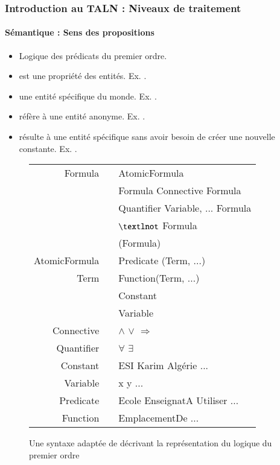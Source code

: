 \documentclass[xcolor=table]{beamer}
\begin{document}
\begin{frame}
\frametitle{Introduction au TALN : Niveaux de traitement}
\framesubtitle{Sémantique : Sens des propositions}

\begin{minipage}{0.5\textwidth}
\begin{itemize}
	\item Logique des prédicats du premier ordre.
	\item {} est une propriété des entités. 
	Ex. .	
	\item {} une entité spécifique du monde. 
	Ex. .
	\item {} réfère à une entité anonyme. 
	Ex. .
	\item {} résulte à une entité spécifique sans avoir besoin de créer une nouvelle constante. 
	Ex. .
\end{itemize}
\end{minipage}
\begin{minipage}{0.48\textwidth}
	\begin{figure}
		{\tiny\bfseries
		\begin{tabular}{rcl}
			\hline\hline
			Formula & \textrightarrow & AtomicFormula \\
			& \textbar        & Formula Connective Formula \\
			& \textbar        & Quantifier Variable, ... Formula \\
			& \textbar        & $\textlnot$ Formula \\
			& \textbar        & (Formula) \\
			AtomicFormula & \textrightarrow & Predicate (Term, ...) \\
			Term    & \textrightarrow & Function(Term, ...) \\
			& \textbar        & Constant \\
			& \textbar        & Variable \\
			Connective & \textrightarrow & $\wedge$ \textbar $\vee$ \textbar $\Rightarrow$ \\
			Quantifier & \textrightarrow & $\forall$ \textbar $\exists$ \\
			Constant & \textrightarrow & ESI \textbar Karim \textbar Algérie ...\\
			Variable & \textrightarrow & x \textbar y \textbar ... \\
			Predicate & \textrightarrow & Ecole \textbar EnseignatA \textbar Utiliser \textbar ... \\
			Function & \textrightarrow & EmplacementDe \textbar ... \\
			\hline\hline
		\end{tabular}
	}
		\caption{Une syntaxe adaptée de \cite{2002-russell-norvig} décrivant la représentation du logique du premier ordre \cite{2019-jurafsky-martin}}
	\end{figure}
\end{minipage}

\end{frame}
\end{document}

